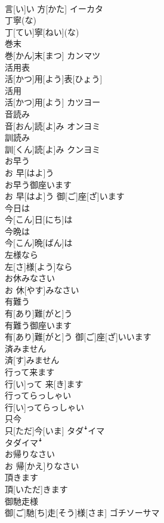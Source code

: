 \documentclass[8pt]{extreport}
\begin{document}
\begin{CJK}{UTF8}{min}
\\	言[い]い 方[かた]	イーカタ
\\	丁寧(な)	
\\	丁[てい]寧[ねい](な)
\\	巻末	
\\	巻[かん]末[まつ]	カンマツ
\\	活用表	
\\	活[かつ]用[よう]表[ひょう]	
\\	活用	
\\	活[かつ]用[よう]	カツヨー
\\	音読み	
\\	音[おん]読[よ]み	オンヨミ
\\	訓読み	
\\	訓[くん]読[よ]み	クンヨミ
\\	お早う	
\\	お 早[はよ]う	
\\	お早う御座います	
\\	お 早[はよ]う 御[ご]座[ざ]います	
\\	今日は	
\\	今[こん]日[にち]は	
\\	今晩は	
\\	今[こん]晩[ばん]は	
\\	左様なら	
\\	左[さ]様[よう]なら	
\\	お休みなさい	
\\	お 休[やす]みなさい	
\\	有難う	
\\	有[あり]難[がと]う	
\\	有難う御座います	
\\	有[あり]難[がと]う 御[ご]座[ざ]いいます	
\\	済みません	
\\	済[す]みません
\\	行って来ます	
\\	行[い]って 来[き]ます
\\	行ってらっしゃい	
\\	行[い]ってらっしゃい
\\	只今	
\\	只[ただ]今[いま]	タダꜜイマ 
\\	タダイマꜜ
\\	お帰りなさい	
\\	お 帰[かえ]りなさい	
\\	頂きます	
\\	頂[いただ]きます
\\	御馳走様	
\\	御[ご]馳[ち]走[そう]様[さま]	ゴチソーサマ

\end{CJK}
\end{document}
